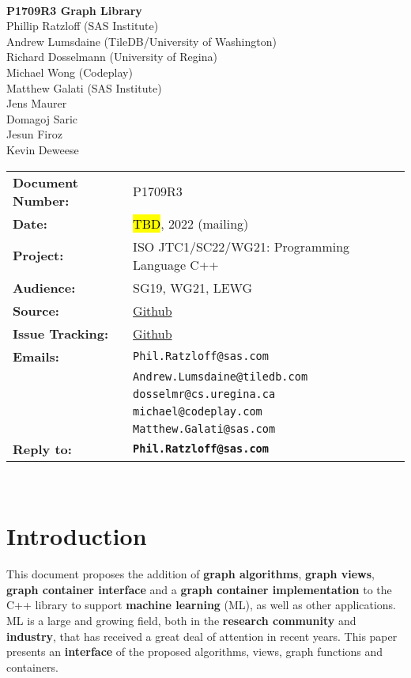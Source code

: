 \documentclass[10pt,onecolumn]{article}
\begin{document}
\begin{titlepage}
~
\vfill
\begin{center}
\LARGE
\textbf{P1709R3 Graph Library}\\
\vspace{12pt}
\normalsize
	Phillip Ratzloff (SAS Institute)\\
	Andrew Lumsdaine (TileDB/University of Washington)\\
	Richard Dosselmann (University of Regina)\\
	Michael Wong (Codeplay)\\
	Matthew Galati (SAS Institute)\\	
	Jens Maurer\\
	Domagoj Saric\\
	Jesun Firoz\\
	Kevin Deweese\\
\end{center}
\vspace{32pt}
\begin{tabular}{ll}
\textbf{Document Number:} & P1709R3\\
\textbf{Date:} & \hl{TBD}, 2022 (mailing)\\ 
\textbf{Project:} & ISO JTC1/SC22/WG21: Programming Language C++\\
\textbf{Audience:} & SG19, WG21, LEWG\\
\textbf{Source:} & \href{https://github.com/pratzl/graph-v2}{Github} \\
\textbf{Issue Tracking:} & \href{https://github.com/pratzl/graph-v2/issues}{Github} \\
\textbf{Emails:}
	&\texttt{Phil.Ratzloff@sas.com}\\
	&\texttt{Andrew.Lumsdaine@tiledb.com}\\
	&\texttt{dosselmr@cs.uregina.ca}\\
	&\texttt{michael@codeplay.com}\\
	&\texttt{Matthew.Galati@sas.com}\\
\textbf{Reply to:}
	&\texttt{\textbf{Phil.Ratzloff@sas.com}}\\
\end{tabular}
\vfill
~
\end{titlepage}

\tableofcontents

\clearpage

\section{Introduction}
This document proposes the addition of \textbf{graph algorithms}, \textbf{graph views}, \textbf{graph container interface} and a \textbf{graph container implementation} to the C++ library to support \textbf{machine learning} (ML), as well as other applications. ML is a large and growing field, both in the \textbf{research community} and \textbf{industry}, that has received a great deal of attention in recent years. This paper presents an \textbf{interface} of the proposed algorithms, views, graph functions and containers.
\end{document}
